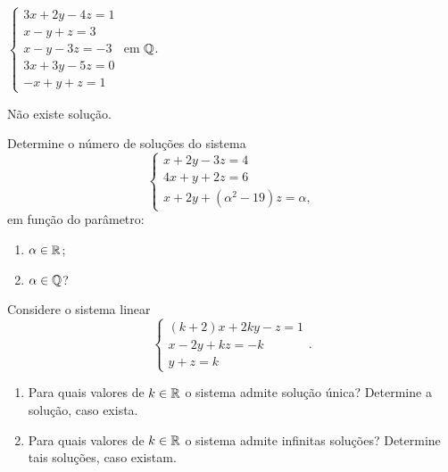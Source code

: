 \documentclass[12pt]{exam}
\begin{document}
\begin{exercicio}\label{sistema_linear_fim_gauss-jordan}
    $
        \begin{cases}
            3x + 2y - 4z = 1\\
            x - y + z = 3\\
            x - y - 3z = -3\\
            3x + 3y - 5z =0\\
            -x + y + z = 1
        \end{cases}
    $
    em $\mathbb{Q}$.
    \begin{solucao}
        Não existe solução.
    \end{solucao}
\end{exercicio}

\begin{exercicio}
    Determine o número de soluções do sistema
    \[
        \begin{cases}
            x + 2y - 3z = 4\\
            4x + y + 2z = 6\\
            x + 2y + (\alpha^2 - 19)z = \alpha,
        \end{cases}
    \]
    em função do parâmetro:
    \begin{enumerate}[label={\alph*})]
        \item $\alpha \in \mathbb{R}$;
        \item $\alpha \in \mathbb{Q}$?
     \end{enumerate}
\end{exercicio}

\begin{exercicio}
    Considere o sistema linear
    \[
        \begin{cases}
            (k + 2)x + 2ky - z = 1\\
            x - 2y + kz = -k\\
            y + z = k
        \end{cases}.
    \]
    \begin{enumerate}[label={\alph*})]
        \item Para quais valores de $k \in \mathbb{R}$ o sistema admite solução única? Determine a solução, caso exista.

        \item Para quais valores de $k \in \mathbb{R}$ o sistema admite infinitas soluções? Determine tais soluções, caso existam.
    \end{enumerate}
\end{exercicio}
\end{document}
